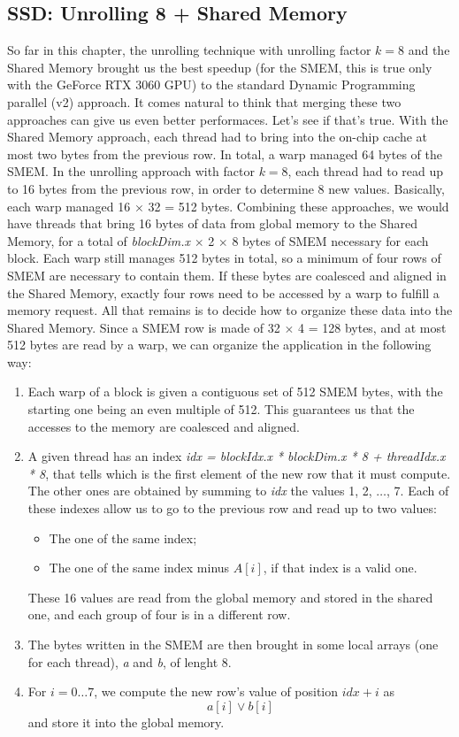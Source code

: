 \documentclass[12pt]{extarticle}
\begin{document}
\subsection{SSD: Unrolling 8 + Shared Memory}
So far in this chapter, the unrolling technique with unrolling factor $k = 8$ and the Shared Memory brought us the best speedup (for the SMEM, this is true only with the GeForce RTX 3060 GPU) to the standard Dynamic Programming parallel (v2) approach. It comes natural to think that merging these two approaches can give us even better performaces. Let's see if that's true.\newline
With the Shared Memory approach, each thread had to bring into the on-chip cache at most two bytes from the previous row. In total, a warp managed 64 bytes of the SMEM.\newline
In the unrolling approach with factor $k = 8$, each thread had to read up to 16 bytes from the previous row, in order to determine 8 new values. Basically, each warp managed 16 $\times$ 32 = 512 bytes.\newline
Combining these approaches, we would have threads that bring 16 bytes of data from global memory to the Shared Memory, for a total of \emph{blockDim.x} $\times$ 2 $\times$ 8 bytes of SMEM necessary for each block. Each warp still manages 512 bytes in total, so a minimum of four rows of SMEM are necessary to contain them. If these bytes are coalesced and aligned in the Shared Memory, exactly four rows need to be accessed by a warp to fulfill a memory request.\newline
All that remains is to decide how to organize these data into the Shared Memory. Since a SMEM row is made of 32 $\times$ 4 = 128 bytes, and at most 512 bytes are read by a warp, we can organize the application in the following way:
\begin{enumerate}
    \item Each warp of a block is given a contiguous set of 512 SMEM bytes, with the starting one being an even multiple of 512. This guarantees us that the accesses to the memory are coalesced and aligned.
    \item A given thread has an index \emph{idx = blockIdx.x * blockDim.x * 8 + threadIdx.x * 8}, that tells which is the first element of the new row that it must compute. The other ones are obtained by summing to \emph{idx} the values 1, 2, $\dots$, 7. Each of these indexes allow us to go to the previous row and read up to two values:
    \begin{itemize}
        \item The one of the same index;
        \item The one of the same index minus $A[i]$, if that index is a valid one.
    \end{itemize}
    These 16 values are read from the global memory and stored in the shared one, and each group of four is in a different row.
    \item The bytes written in the SMEM are then brought in some local arrays (one for each thread), \emph{a} and \emph{b}, of lenght 8.
    \item For $i = 0 \dots 7$, we compute the new row's value of position $idx + i$ as
    \[a[i] \lor b[i]\]
    and store it into the global memory.
\end{enumerate}
\end{document}
